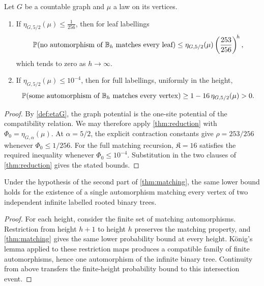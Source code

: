 \begin{theorem}
\label{thm:matching}
\leanok
{}
Let $G$ be a countable graph and $\mu$ a law on its vertices.
\begin{enumerate}
\item If $\eta_{G,5/2}(\mu)\leq\tfrac1{256}$, then for leaf labellings
\[
 \mathbb{P}(\text{no automorphism of }\mathbb{B}_h\text{ matches every leaf})
 \leq\eta_{G,5/2}(\mu)\left(\frac{253}{256}\right)^{\!h},
\]
which tends to zero as $h\to\infty$.
\item If $\eta_{G,5/2}(\mu)\leq10^{-4}$, then for full labellings, uniformly in the height,
\[
 \mathbb{P}(\text{some automorphism of }\mathbb{B}_h\text{ matches every vertex})
 \geq1-16\,\eta_{G,5/2}(\mu)>0 .
\]
\end{enumerate}
\end{theorem}

\begin{proof}
\leanok
{}
By \cref{def:etaG}, the graph potential is the one-site potential of the compatibility
relation. We may therefore apply \cref{thm:reduction} with
$\Phi_0=\eta_{G,\alpha}(\mu)$. At $\alpha=5/2$, the explicit contraction constants give
$\rho=253/256$ whenever $\Phi_0\leq1/256$. For the full matching recursion,
$\mathfrak K=16$ satisfies the required inequality whenever $\Phi_0\leq10^{-4}$. Substitution
in the two clauses of \cref{thm:reduction} gives the stated bounds.
\end{proof}

\begin{theorem}
\label{thm:infinite}
\leanok
Under the hypothesis of the second part of \cref{thm:matching}, the same lower bound holds
for the existence of a single automorphism matching every vertex of two independent
infinite labelled rooted binary trees.
\end{theorem}

\begin{proof}
\leanok
{}
For each height, consider the finite set of matching automorphisms. Restriction from height
$h+1$ to height $h$ preserves the matching property, and \cref{thm:matching} gives the same
lower probability bound at every height. K\"onig's lemma applied to these restriction maps
produces a compatible family of finite automorphisms, hence one automorphism of the infinite
binary tree. Continuity from above transfers the finite-height probability bound to this
intersection event.
\end{proof}

